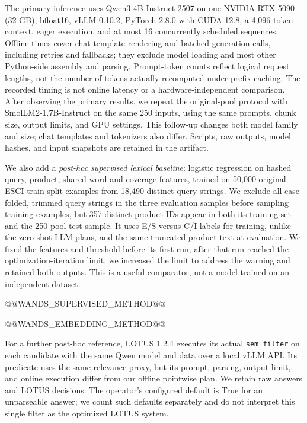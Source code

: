 \documentclass[conference]{IEEEtran}
\begin{document}
The primary inference uses Qwen3-4B-Instruct-2507 \cite{qwen} on one NVIDIA RTX 5090 (32 GB), bfloat16, vLLM 0.10.2, PyTorch 2.8.0 with CUDA 12.8, a 4,096-token context, eager execution, and at most 16 concurrently scheduled sequences. Offline times cover chat-template rendering and batched generation calls, including retries and fallbacks; they exclude model loading and most other Python-side assembly and parsing. Prompt-token counts reflect logical request lengths, not the number of tokens actually recomputed under prefix caching. The recorded timing is not online latency or a hardware-independent comparison. After observing the primary results, we repeat the original-pool protocol with SmolLM2-1.7B-Instruct \cite{smollm} on the same 250 inputs, using the same prompts, chunk size, output limits, and GPU settings. This follow-up changes both model family and size; chat templates and tokenizers also differ. Scripts, raw outputs, model hashes, and input snapshots are retained in the artifact.

We also add a \emph{post-hoc supervised lexical baseline}: logistic regression on hashed query, product, shared-word and coverage features, trained on 50,000 original ESCI train-split examples from 18,490 distinct query strings. We exclude all case-folded, trimmed query strings in the three evaluation samples before sampling training examples, but 357 distinct product IDs appear in both its training set and the 250-pool test sample. It uses E/S versus C/I labels for training, unlike the zero-shot LLM plans, and the same truncated product text at evaluation. We fixed the features and threshold before its first run; after that run reached the optimization-iteration limit, we increased the limit to address the warning and retained both outputs. This is a useful comparator, not a model trained on an independent dataset.

@@WANDS_SUPERVISED_METHOD@@

@@WANDS_EMBEDDING_METHOD@@

For a further post-hoc reference, LOTUS 1.2.4 executes its actual \texttt{sem\_filter} on each candidate with the same Qwen model and data over a local vLLM API. Its predicate uses the same relevance proxy, but its prompt, parsing, output limit, and online execution differ from our offline pointwise plan. We retain raw answers and LOTUS decisions. The operator's configured default is True for an unparseable answer; we count such defaults separately and do not interpret this single filter as the optimized LOTUS system.
\end{document}
